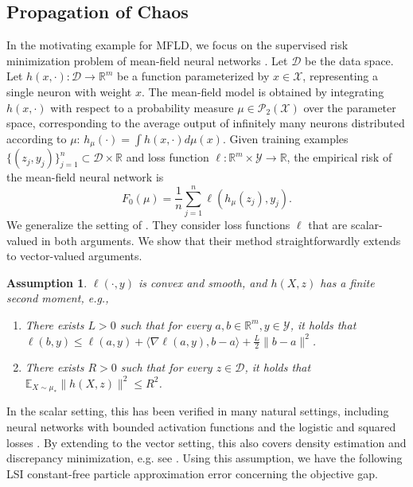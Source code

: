 \documentclass{article}
\newtheorem{assumption}{Assumption}
\begin{document}
\subsection{Propagation of Chaos}\label{sec:chaosmfnn}
In the motivating example for MFLD, we focus on the supervised risk minimization problem of mean-field neural networks \citep{nitanda2022convex,suzuki2023meanfield}. Let $\mathcal{D}$ be the data space. Let $h(x,\cdot):\mathcal{D}\to\mathbb{R}^m$ be a function parameterized by $x\in\mathcal{X}$, representing a single neuron with weight $x$. The mean-field model is obtained by integrating $h(x,\cdot)$ with respect to a probability measure $\mu\in\mathcal{P}_2(\mathcal{X})$ over the parameter space, corresponding to the average output of infinitely many neurons distributed according to $\mu$: $h_\mu(\cdot) = \int h(x,\cdot)d\mu(x)$. Given training examples $\{(z_j,y_j)\}_{j=1}^n\subset\mathcal{D}\times\mathbb{R}$ and loss function $\ell:\mathbb{R}^m\times\mathcal{Y}\to\mathbb{R}$, the empirical risk of the mean-field neural network is
\begin{equation}\label{eq:F_0}
    \textstyle F_0(\mu) = \frac{1}{n}\sum_{j=1}^n\ell(h_\mu(z_j),y_j).
\end{equation}
We generalize the setting of \citet{nitanda2024improved}. They consider loss functions $\ell$ that are scalar-valued in both arguments. We show that their method straightforwardly extends to vector-valued arguments. 
\begin{assumption}\label{asmp:loss}
    $\ell(\cdot,y)$ is convex and smooth, and $h(X,z)$ has a finite second moment, e.g.,
    \begin{enumerate}
        \item[(i)] There exists $L>0$ such that for every $a,b\in\mathbb{R}^m,y\in\mathcal{Y}$, it holds that $\ell(b,y)\le \ell(a,y) + \langle\nabla\ell(a,y),b-a\rangle + \frac{L}{2}\|b-a\|^2$. 
        \item[(ii)] There exists $R>0$ such that for every $z\in\mathcal{D}$, it holds that $\mathbb{E}_{X\sim\mu_*}\|h(X,z)\|^2\le R^2$.
    \end{enumerate}
\end{assumption}
In the scalar setting, this has been verified in many natural settings, including neural networks with bounded activation functions and the logistic and squared losses \citep{nitanda2022convex,chizat2022meanfield,suzuki2023meanfield,nitanda2024improved}. By extending to the vector setting, this also covers density estimation and discrepancy minimization, e.g. see \citet[Appendix A]{suzuki2023meanfield}. Using this assumption, we have the following LSI constant-free particle approximation error concerning the objective gap.
\end{document}
